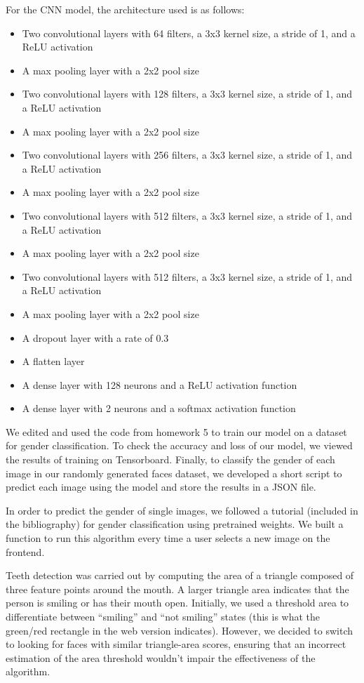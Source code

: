 For the CNN model, the architecture used is as follows:
\begin{itemize}
    \item Two convolutional layers with 64 filters, a 3x3 kernel size, a stride of 1, and a ReLU activation
    \item A max pooling layer with a 2x2 pool size
    \item Two convolutional layers with 128 filters, a 3x3 kernel size, a stride of 1, and a ReLU activation
    \item A max pooling layer with a 2x2 pool size
    \item Two convolutional layers with 256 filters, a 3x3 kernel size, a stride of 1, and a ReLU activation
    \item A max pooling layer with a 2x2 pool size
    \item Two convolutional layers with 512 filters, a 3x3 kernel size, a stride of 1, and a ReLU activation
    \item A max pooling layer with a 2x2 pool size
    \item Two convolutional layers with 512 filters, a 3x3 kernel size, a stride of 1, and a ReLU activation
    \item A max pooling layer with a 2x2 pool size
    \item A dropout layer with a rate of 0.3
    \item A flatten layer
    \item A dense layer with 128 neurons and a ReLU activation function
    \item A dense layer with 2 neurons and a softmax activation function
\end{itemize}

We edited and used the code from homework 5 to train our model on a dataset for gender classification. To check
the accuracy and loss of our model, we viewed the results of training on Tensorboard. Finally, to classify the gender of
each image in our randomly generated faces dataset, we developed a short script to predict each image using the model and
store the results in a JSON file.

In order to predict the gender of single images, we followed a tutorial (included in the bibliography) for gender classification using pretrained weights.
We built a function to run this algorithm every time a user selects a new image on the frontend.

Teeth detection was carried out by computing the area of a triangle composed of three feature points around the mouth. A larger triangle area indicates that the person is smiling or has their mouth open. Initially, we used a threshold area to differentiate between ``smiling'' and ``not smiling'' states (this is what the green/red rectangle in the web version indicates). However, we decided to switch to looking for faces with similar triangle-area scores, ensuring that an incorrect estimation of the area threshold wouldn't impair the effectiveness of the algorithm.

